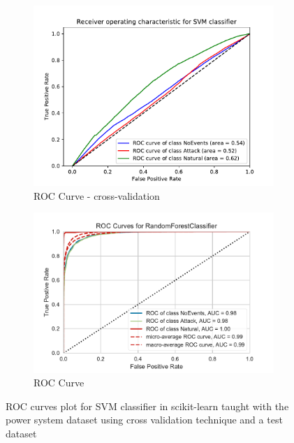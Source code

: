 \begin{figure}[t]
    \centering
    \begin{subfigure}[t]{110mm}
        \centering
        \includegraphics[page=1, width=\linewidth]{images/results_scikit/SVM}
        \caption{ROC Curve - cross-validation}
        \label{fig:scikit_SVM_ROC}
    \end{subfigure}
    \begin{subfigure}[t]{110mm}
        \centering
        \includegraphics[page=2, width=\linewidth]{images/roc_3c}
        \caption{ROC Curve}
        \label{fig:scikit_RF_ROC}
    \end{subfigure}
    \caption{ROC curves plot for SVM classifier in scikit-learn taught with the power system dataset using cross validation technique and a test dataset}
    \label{fig:ROCCM_SVM}
\end{figure}



